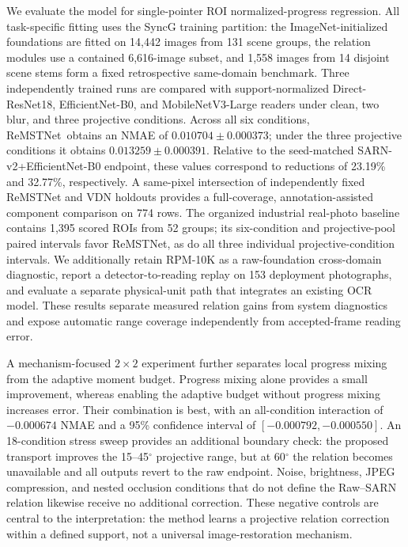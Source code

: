 \documentclass[electronics,article,submit,oneauthor]{Definitions/mdpi}
\newcommand{\modelname}{ReMSTNet}
\begin{document}
We evaluate the model for single-pointer ROI normalized-progress regression. All task-specific fitting uses the SyncG training partition: the ImageNet-initialized foundations are fitted on 14,442 images from 131 scene groups, the relation modules use a contained 6,616-image subset, and 1,558 images from 14 disjoint scene stems form a fixed retrospective same-domain benchmark. Three independently trained runs are compared with support-normalized Direct-ResNet18, EfficientNet-B0, and MobileNetV3-Large readers under clean, two blur, and three projective conditions. Across all six conditions, \modelname\ obtains an NMAE of $0.010704\pm0.000373$; under the three projective conditions it obtains $0.013259\pm0.000391$. Relative to the seed-matched SARN-v2+EfficientNet-B0 endpoint, these values correspond to reductions of 23.19\% and 32.77\%, respectively. A same-pixel intersection of independently fixed ReMSTNet and VDN holdouts provides a full-coverage, annotation-assisted component comparison on 774 rows. The organized industrial real-photo baseline contains 1,395 scored ROIs from 52 groups; its six-condition and projective-pool paired intervals favor \modelname, as do all three individual projective-condition intervals. We additionally retain RPM-10K as a raw-foundation cross-domain diagnostic, report a detector-to-reading replay on 153 deployment photographs, and evaluate a separate physical-unit path that integrates an existing OCR model. These results separate measured relation gains from system diagnostics and expose automatic range coverage independently from accepted-frame reading error.

A mechanism-focused $2\times2$ experiment further separates local progress mixing from the adaptive moment budget. Progress mixing alone provides a small improvement, whereas enabling the adaptive budget without progress mixing increases error. Their combination is best, with an all-condition interaction of $-0.000674$ NMAE and a 95\% confidence interval of $[-0.000792,-0.000550]$. An 18-condition stress sweep provides an additional boundary check: the proposed transport improves the 15--45$^{\circ}$ projective range, but at 60$^{\circ}$ the relation becomes unavailable and all outputs revert to the raw endpoint. Noise, brightness, JPEG compression, and nested occlusion conditions that do not define the Raw--SARN relation likewise receive no additional correction. These negative controls are central to the interpretation: the method learns a projective relation correction within a defined support, not a universal image-restoration mechanism.
\end{document}
